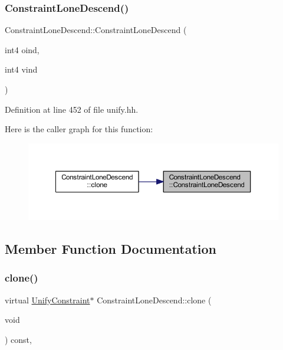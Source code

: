 \subsubsection{\texorpdfstring{ConstraintLoneDescend()}{ConstraintLoneDescend()}}
{\footnotesize\ttfamily Constraint\+Lone\+Descend\+::\+Constraint\+Lone\+Descend (\begin{DoxyParamCaption}\item[{int4}]{oind,  }\item[{int4}]{vind }\end{DoxyParamCaption})\hspace{0.3cm}{\ttfamily [inline]}}



Definition at line 452 of file unify.\+hh.

Here is the caller graph for this function\+:
\nopagebreak
\begin{figure}[H]
\begin{center}
\leavevmode
\includegraphics[width=350pt]{class_constraint_lone_descend_a4c469bc8f7ade8efd49ea4e058d6e93b_icgraph}
\end{center}
\end{figure}


\subsection{Member Function Documentation}
\mbox{\label{class_constraint_lone_descend_a8dea8363968160213540242b07aaf972}} 
\subsubsection{\texorpdfstring{clone()}{clone()}}
{\footnotesize\ttfamily virtual \mbox{\hyperlink{class_unify_constraint}{Unify\+Constraint}}$\ast$ Constraint\+Lone\+Descend\+::clone (\begin{DoxyParamCaption}\item[{void}]{ }\end{DoxyParamCaption}) const\hspace{0.3cm}{\ttfamily [inline]}, {\ttfamily [virtual]}}



